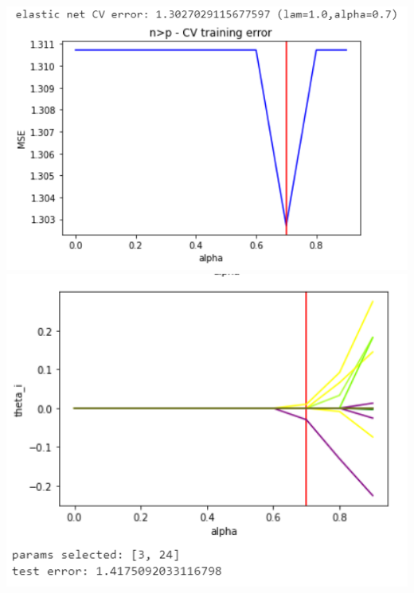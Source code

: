 \documentclass[11pt]{article}
\begin{document}
\begin{center}
\includegraphics[scale=0.7]{charts/en_corr_n_gt_p_err.PNG}
\includegraphics[scale=0.7]{charts/en_corr_n_gt_p_thetas.PNG}


\end{center}
\end{document}
